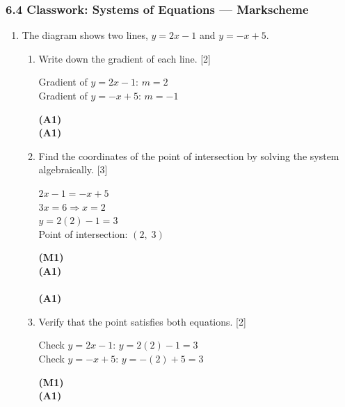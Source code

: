\documentclass[12pt, twoside]{article}
\begin{document}
\subsubsection*{6.4 Classwork: Systems of Equations --- Markscheme}

\begin{enumerate}[itemsep=0.2cm]

\item The diagram shows two lines, $y = 2x - 1$ and $y = -x + 5$.

\begin{enumerate}[itemsep=0.3cm]
  \item Write down the gradient of each line. \hfill [2]

  \begin{minipage}[t]{0.62\textwidth}
  Gradient of $y = 2x - 1$: \quad $m = 2$\\[0.15cm]
  Gradient of $y = -x + 5$: \quad $m = -1$
  \end{minipage}%
  \begin{minipage}[t]{0.35\textwidth}\raggedleft
  \textbf{(A1)}\\[0.15cm]
  \textbf{(A1)}
  \end{minipage}

  \medskip
  \item Find the coordinates of the point of intersection by solving
        the system algebraically. \hfill [3]

  \begin{minipage}[t]{0.62\textwidth}
  $2x - 1 = -x + 5$\\[0.15cm]
  $3x = 6 \Rightarrow x = 2$\\[0.15cm]
  $y = 2(2) - 1 = 3$\\[0.15cm]
  Point of intersection: $(2,\; 3)$
  \end{minipage}%
  \begin{minipage}[t]{0.35\textwidth}\raggedleft
  \textbf{(M1)}\\[0.15cm]
  \textbf{(A1)}\\[0.15cm]
  ~\\[0.15cm]
  \textbf{(A1)}
  \end{minipage}

  \medskip
  \item Verify that the point satisfies both equations. \hfill [2]

  \begin{minipage}[t]{0.62\textwidth}
  Check $y = 2x - 1$: $y = 2(2) - 1 = 3$ \quad \checkmark\\[0.15cm]
  Check $y = -x + 5$: $y = -(2) + 5 = 3$ \quad \checkmark
  \end{minipage}%
  \begin{minipage}[t]{0.35\textwidth}\raggedleft
  \textbf{(M1)}\\[0.15cm]
  \textbf{(A1)}
  \end{minipage}
\end{enumerate}


\end{enumerate}
\end{document}
